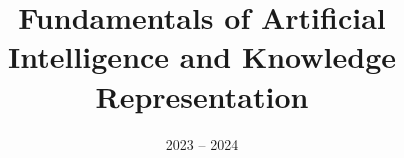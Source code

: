 \documentclass[11pt]{ainotes}
\title{Fundamentals of Artificial Intelligence and Knowledge Representation}
\date{2023 -- 2024}
\begin{document}
    \makenotesfront

    
    
\end{document}
